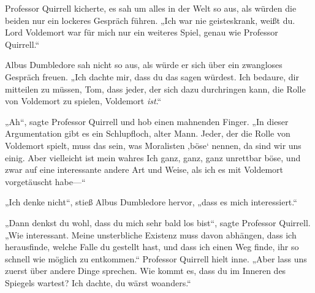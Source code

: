 Professor Quirrell kicherte, es sah um alles in der Welt so aus, als würden die beiden nur ein lockeres Gespräch führen.
„Ich war nie geisteskrank, weißt du. Lord Voldemort war für mich nur ein weiteres Spiel, genau wie Professor Quirrell.“

Albus Dumbledore sah nicht so aus, als würde er sich über ein zwangloses Gespräch freuen. „Ich dachte mir, dass du das sagen würdest. Ich bedaure, dir mitteilen zu müssen, Tom, dass jeder, der sich dazu durchringen kann, die Rolle von Voldemort zu spielen, Voldemort \emph{ist}.“

„Ah“, sagte Professor Quirrell und hob einen mahnenden Finger. „In dieser Argumentation gibt es ein Schlupfloch, alter Mann. Jeder, der die Rolle von Voldemort spielt, muss das sein, was Moralisten ‚böse‘ nennen, da sind wir uns einig. Aber vielleicht ist mein wahres Ich ganz, ganz, ganz unrettbar böse, und zwar auf eine interessante andere Art und Weise, als ich es mit Voldemort vorgetäuscht habe—“

„Ich denke nicht“, stieß Albus Dumbledore hervor, „dass es mich interessiert.“

„Dann denkst du wohl, dass du mich sehr bald los bist“, sagte Professor Quirrell. „Wie interessant. Meine unsterbliche Existenz muss davon abhängen, dass ich herausfinde, welche Falle du gestellt hast, und dass ich einen Weg finde, ihr so schnell wie möglich zu entkommen.“ Professor Quirrell hielt inne. „Aber lass uns zuerst über andere Dinge sprechen. Wie kommt es, dass du im Inneren des Spiegels wartest? Ich dachte, du wärst woanders.“

